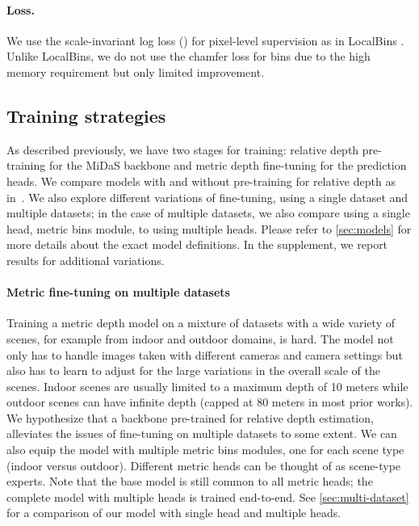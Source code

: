 \documentclass[10pt,twocolumn,letterpaper]{article}
\begin{document}
\paragraph{Loss.} We use the scale-invariant log loss () for pixel-level supervision as in LocalBins \cite{bhat2022localbins}.
Unlike LocalBins, we do not use the chamfer loss for bins due to the high memory requirement but only limited improvement.

\subsection{Training strategies}
\label{subsec:train_strat}
As described previously, we have two stages for training: relative depth pre-training for the MiDaS backbone and metric depth fine-tuning for the prediction heads. We compare models with and without pre-training for relative depth as in~\cite{Ranftl2020MiDaS}. We also explore different variations of fine-tuning, using a single dataset and multiple datasets; in the case of multiple datasets, we also compare using a single head, \ie metric bins module, to using multiple heads. Please refer to \cref{sec:models} for more details about the exact model definitions. In the supplement, we report results for additional variations. 

\paragraph{Metric fine-tuning on multiple datasets}
Training a metric depth model on a mixture of datasets with a wide variety of scenes, for example from indoor and outdoor domains, is hard. The model not only has to handle images taken with different cameras and camera settings but also has to learn to adjust for the large variations in the overall scale of the scenes. Indoor scenes are usually limited to a maximum depth of 10 meters while outdoor scenes can have infinite depth (capped at 80 meters in most prior works). 
We hypothesize that a backbone pre-trained for relative depth estimation, alleviates the issues of fine-tuning on multiple datasets to some extent. 
We can also equip the model with multiple metric bins modules, one for each scene type (indoor versus outdoor). Different metric heads can be thought of as scene-type experts. Note that the base model is still common to all metric heads; the complete model with multiple heads is trained end-to-end. See \cref{sec:multi-dataset} for a comparison of our model with single head and multiple heads. 
\end{document}
